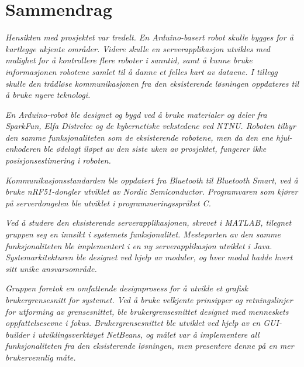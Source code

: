 \chapter*{Sammendrag}
\textit{Hensikten med prosjektet var tredelt. En Arduino-basert robot skulle bygges for å kartlegge ukjente områder. Videre skulle en serverapplikasjon utvikles med mulighet for å kontrollere flere roboter i sanntid, samt å kunne bruke informasjonen robotene samlet til å danne et felles kart av dataene. I tillegg skulle den trådløse kommunikasjonen fra den eksisterende løsningen oppdateres til å bruke nyere teknologi.}

\textit{En Arduino-robot ble designet og bygd ved å bruke materialer og deler fra SparkFun, Elfa Distrelec og de kybernetiske vekstedene ved NTNU. Roboten tilbyr den samme funksjonaliteten som de eksisterende robotene, men da den ene hjul-enkoderen ble ødelagt iløpet av den siste uken av prosjektet, fungerer ikke posisjonsestimering i roboten.}

\textit{Kommunikasjonsstandarden ble oppdatert fra Bluetooth til Bluetooth Smart, ved å bruke nRF51-dongler utviklet av Nordic Semiconductor. Programvaren som kjører på serverdongelen ble utviklet i programmeringsspråket C.}

\textit{Ved å studere den eksisterende serverapplikasjonen, skrevet i MATLAB, tilegnet gruppen seg en innsikt i systemets funksjonalitet. Mesteparten av den samme funksjonaliteten ble implementert i en ny serverapplikasjon utviklet i Java. Systemarkitekturen ble designet ved hjelp av moduler, og hver modul hadde hvert sitt unike ansvarsområde.}

\textit{Gruppen foretok en omfattende designprosess for å utvikle et grafisk brukergrensesnitt for systemet. Ved å bruke velkjente prinsipper og retningslinjer for utforming av grensesnittet, ble brukergrensesnittet designet med menneskets oppfattelsesevne i fokus. Brukergrensesnittet ble utviklet ved hjelp av en GUI-builder i utviklingsverktøyet NetBeans, og målet var å implementere all funksjonaliteten fra den eksisterende løsningen, men presentere denne på en mer brukervennlig måte.}